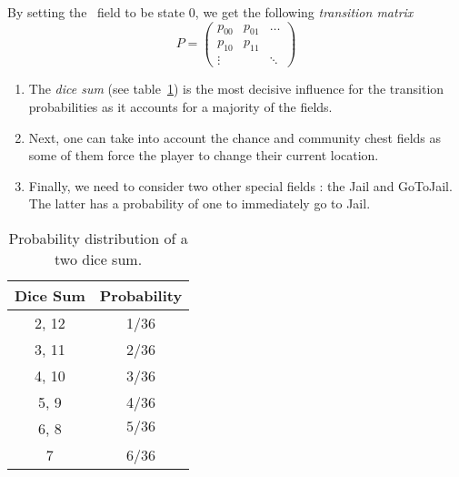 By setting the \go~field to be state 0, we get the following \emph{transition matrix}
\[
  P = \begin{pmatrix}
    p_{00} & p_{01} & \dots \\
    p_{10} & p_{11} &  \\
    \vdots      &  & \ddots
  \end{pmatrix}
\]

\begin{enumerate}
  \item The \emph{dice sum} (see table~\ref{tab:dice_sum_prob}) is the 
  most decisive influence for the transition probabilities
  as it accounts for a majority of the fields.
  \item Next, one can take into account the chance and community chest
  fields as some of them force the player to change their current location.
  \item Finally, we need to consider two other special fields :
  the Jail and GoToJail. The latter has a probability
  of one to immediately go to Jail.
\end{enumerate}

\begin{table}
  \begin{center}
    \begin{tabular}{|c|c|}
      \hline
        \textbf{Dice Sum} & \textbf{Probability} \\
        \hline \hline
        2, 12 & 1/36 \\
        \hline
        3, 11 & 2/36 \\
        \hline
        4, 10 & 3/36 \\
        \hline
        5, 9 & 4/36 \\
        \hline
        6, 8 & $5/36$ \\
        \hline
        7 & 6/36 \\
      \hline
    \end{tabular}
  \end{center}
  \caption{Probability distribution of a two dice sum.}
  \label{tab:dice_sum_prob}
\end{table}



